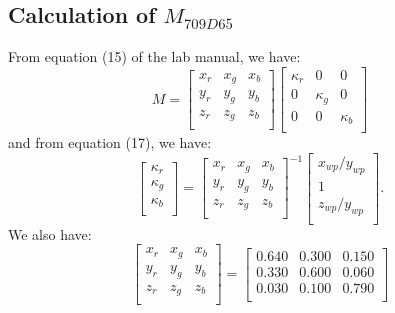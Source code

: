 \documentclass{article}
\begin{document}
\subsection{Calculation of $M_{709D65}$}
	From equation (15) of the lab manual, we have:
	\begin{equation}
		M =
		\begin{bmatrix}
		x_r & x_g & x_b \\
		y_r & y_g & y_b \\
		z_r & z_g & z_b \\
		\end{bmatrix}
		\begin{bmatrix}
		\kappa_r & 0 & 0 \\
		0 & \kappa_g & 0 \\
		0 & 0 & \kappa_b \\
		\end{bmatrix}
	\end{equation}
	and from equation (17), we have:
	\begin{equation}
		\begin{bmatrix}
		\kappa_r \\
		\kappa_g \\
		\kappa_b \\
		\end{bmatrix}
		=
		\begin{bmatrix}
		x_r & x_g & x_b \\
		y_r & y_g & y_b \\
		z_r & z_g & z_b \\
		\end{bmatrix}
		^{-1}
		\begin{bmatrix}
		x_{wp}/y_{wp} \\
		1 \\
		z_{wp}/y_{wp}\\
		\end{bmatrix}
		.
	\end{equation}
	We also have:
	\begin{equation}
		\begin{bmatrix}
		x_r & x_g & x_b \\
		y_r & y_g & y_b \\
		z_r & z_g & z_b \\
		\end{bmatrix}
		=
		\begin{bmatrix}
		0.640 & 0.300 & 0.150 \\
		0.330 & 0.600 & 0.060 \\
		0.030 & 0.100 & 0.790 \\
		\end{bmatrix}
	\end{equation}
\end{document}
